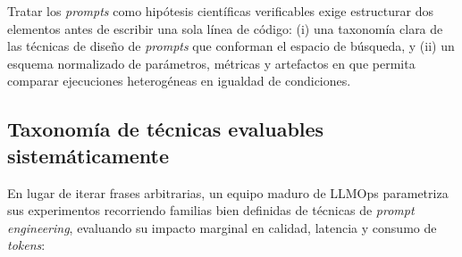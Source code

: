 Tratar los \textit{prompts} como hipótesis científicas verificables exige estructurar dos elementos antes de escribir una sola línea de código: (i) una taxonomía clara de las técnicas de diseño de \textit{prompts} que conforman el espacio de búsqueda, y (ii) un esquema normalizado de parámetros, métricas y artefactos en  que permita comparar ejecuciones heterogéneas en igualdad de condiciones.

\subsection{Taxonomía de técnicas evaluables sistemáticamente}\label{subsec:taxonomia-prompting}

En lugar de iterar frases arbitrarias, un equipo maduro de LLMOps parametriza sus experimentos recorriendo familias bien definidas de técnicas de \textit{prompt engineering}, evaluando su impacto marginal en calidad, latencia y consumo de \textit{tokens}:

